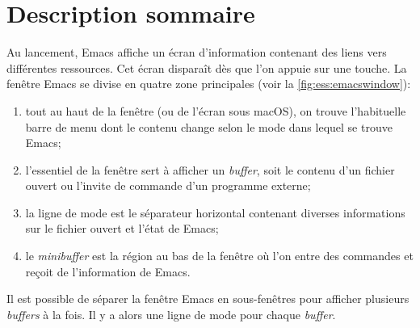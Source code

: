 \section{Description sommaire}
\label{emacs+ess:description}

Au lancement, Emacs affiche un écran d'information contenant des liens
vers différentes ressources. Cet écran disparaît dès que l'on appuie
sur une touche. La fenêtre Emacs se divise en quatre zone principales
(voir la \autoref{fig:ess:emacswindow}):
\begin{enumerate}
\item tout au haut de la fenêtre (ou de l'écran sous macOS), on trouve
  l'habituelle barre de menu dont le contenu change selon le mode dans
  lequel se trouve Emacs;
\item l'essentiel de la fenêtre sert à afficher un \emph{buffer}, soit
  le contenu d'un fichier ouvert ou l'invite de commande d'un
  programme externe;
\item la ligne de mode est le séparateur horizontal contenant diverses
  informations sur le fichier ouvert et l'état de Emacs;
\item le \emph{minibuffer} est la région au bas de la fenêtre où l'on
  entre des commandes et reçoit de l'information de Emacs.
\end{enumerate}
Il est possible de séparer la fenêtre Emacs en sous-fenêtres pour
afficher plusieurs \emph{buffers} à la fois. Il y a alors une ligne de
mode pour chaque \emph{buffer}.

